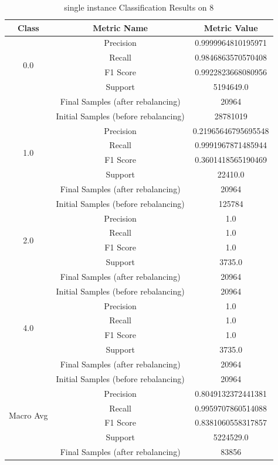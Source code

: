 \begin{longtable}{|c|c|c|}
\caption{single instance Classification Results on 8} \label{tab:8_single_instance_classifiers_results} \\
\hline
Class & Metric Name & Metric Value \\
\hline
\multirow{4}{*}{0.0} & Precision & 0.9999964810195971 \\
 & Recall & 0.9846863570570408 \\
 & F1 Score & 0.9922823668080956 \\
 & Support & 5194649.0 \\
 & Final Samples (after rebalancing) & 20964 \\
 & Initial Samples (before rebalancing) & 28781019 \\
\hline
\multirow{4}{*}{1.0} & Precision & 0.21965646795695548 \\
 & Recall & 0.9991967871485944 \\
 & F1 Score & 0.3601418565190469 \\
 & Support & 22410.0 \\
 & Final Samples (after rebalancing) & 20964 \\
 & Initial Samples (before rebalancing) & 125784 \\
\hline
\multirow{4}{*}{2.0} & Precision & 1.0 \\
 & Recall & 1.0 \\
 & F1 Score & 1.0 \\
 & Support & 3735.0 \\
 & Final Samples (after rebalancing) & 20964 \\
 & Initial Samples (before rebalancing) & 20964 \\
\hline
\multirow{4}{*}{4.0} & Precision & 1.0 \\
 & Recall & 1.0 \\
 & F1 Score & 1.0 \\
 & Support & 3735.0 \\
 & Final Samples (after rebalancing) & 20964 \\
 & Initial Samples (before rebalancing) & 20964 \\
\hline
\multirow{4}{*}{Macro Avg} & Precision & 0.8049132372441381 \\
 & Recall & 0.9959707860514088 \\
 & F1 Score & 0.8381060558317857 \\
 & Support & 5224529.0 \\
 & Final Samples (after rebalancing) & 83856 \\

\end{longtable}
